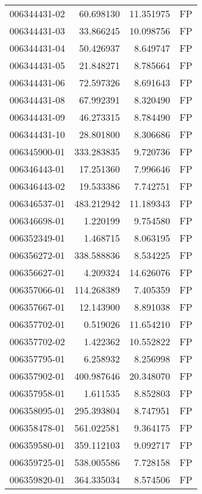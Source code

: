\begin{tabular}{lrrl}
006344431-02 &   60.698130 &      11.351975 &   FP \\
006344431-03 &   33.866245 &      10.098756 &   FP \\
006344431-04 &   50.426937 &       8.649747 &   FP \\
006344431-05 &   21.848271 &       8.785664 &   FP \\
006344431-06 &   72.597326 &       8.691643 &   FP \\
006344431-08 &   67.992391 &       8.320490 &   FP \\
006344431-09 &   46.273315 &       8.784490 &   FP \\
006344431-10 &   28.801800 &       8.306686 &   FP \\
006345900-01 &  333.283835 &       9.720736 &   FP \\
006346443-01 &   17.251360 &       7.996646 &   FP \\
006346443-02 &   19.533386 &       7.742751 &   FP \\
006346537-01 &  483.212942 &      11.189343 &   FP \\
006346698-01 &    1.220199 &       9.754580 &   FP \\
006352349-01 &    1.468715 &       8.063195 &   FP \\
006356272-01 &  338.588836 &       8.534225 &   FP \\
006356627-01 &    4.209324 &      14.626076 &   FP \\
006357066-01 &  114.268389 &       7.405359 &   FP \\
006357667-01 &   12.143900 &       8.891038 &   FP \\
006357702-01 &    0.519026 &      11.654210 &   FP \\
006357702-02 &    1.422362 &      10.552822 &   FP \\
006357795-01 &    6.258932 &       8.256998 &   FP \\
006357902-01 &  400.987646 &      20.348070 &   FP \\
006357958-01 &    1.611535 &       8.852803 &   FP \\
006358095-01 &  295.393804 &       8.747951 &   FP \\
006358478-01 &  561.022581 &       9.364175 &   FP \\
006359580-01 &  359.112103 &       9.092717 &   FP \\
006359725-01 &  538.005586 &       7.728158 &   FP \\
006359820-01 &  364.335034 &       8.574506 &   FP \\

\end{tabular}
